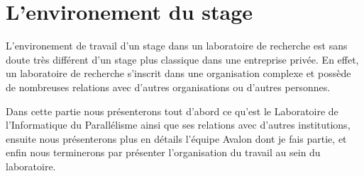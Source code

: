 \newpage
\section{L'environement du stage}
L'environement de travail d'un stage dans un laboratoire de recherche est sans doute très différent d'un stage plus classique dans une entreprise privée. En effet, un laboratoire de recherche s'inscrit dans une organisation complexe et possède de nombreuses relations avec d'autres organisations ou d'autres personnes.

Dans cette partie nous présenterons tout d'abord ce qu'est le Laboratoire de l'Informatique du Parallélisme ainsi que ses relations avec d'autres institutions, ensuite nous présenterons plus en détails l'équipe Avalon dont je fais partie, et enfin nous terminerons par présenter l'organisation du travail au sein du laboratoire.



